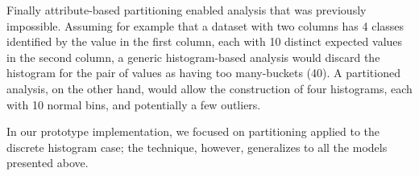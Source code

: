 Finally attribute-based partitioning enabled analysis that was previously impossible. Assuming for example that a dataset with two columns has 4 classes identified by the value in the first column, each with 10 distinct expected values in the second column, a generic histogram-based analysis would discard the histogram for the pair of values as having too many-buckets (40). A partitioned analysis, on the other hand, would allow the construction of four histograms, each with 10 normal bins, and potentially a few outliers.

In our prototype implementation, we focused on partitioning applied to the discrete histogram case; the technique, however, generalizes to all the models presented above.

